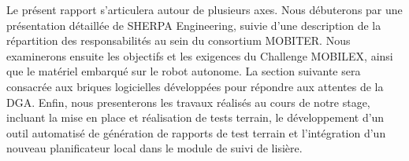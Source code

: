 \indent Le présent rapport s'articulera autour de plusieurs axes. Nous débuterons par une présentation détaillée de SHERPA Engineering, suivie d'une description de la répartition des responsabilités au sein du consortium MOBITER. Nous examinerons ensuite les objectifs et les exigences du Challenge MOBILEX, ainsi que le matériel embarqué sur le robot autonome. La section suivante sera consacrée aux briques logicielles développées pour répondre aux attentes de la DGA. Enfin, nous presenterons les travaux réalisés au cours de notre stage, incluant la mise en place et réalisation de tests terrain, le développement d'un outil automatisé de génération de rapports de test terrain et l'intégration d'un nouveau planificateur local dans le module de suivi de lisière.
